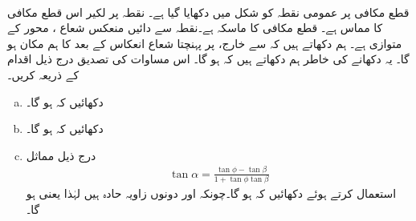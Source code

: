 \\
قطع مکافی  پر عمومی نقطہ  کو شکل  میں دکھایا گیا ہے۔ نقطہ  پر لکیر  اس قطع مکافی کا مماس ہے۔ قطع مکافی کا ماسکہ  ہے۔نقطہ  سے دائیں منعکس شعاع ، محور  کے متوازی  ہے۔ ہم دکھاتے ہیں کہ  سے خارج،  پر پہنچتا شعاع انعکاس کے بعد  کا ہم مکان ہو گا۔ یہ دکھانے کی خاطر ہم دکھاتے ہیں کہ  ہو گا۔ اس مساوات کی تصدیق درج ذیل اقدام کے ذریعہ کریں۔
\begin{enumerate}[a.]
\item
دکھائیں کہ  ہو گا۔
\item
دکھائیں کہ  ہو گا۔
\item
درج ذیل مماثل
\begin{align*}
\tan \alpha=\frac{\tan \phi-\tan\beta}{1+\tan\phi\tan\beta}
\end{align*}
استعمال کرتے ہوئے دکھائیں کہ  ہو گا۔چونکہ  اور  دونوں زاویہ حادہ ہیں لہٰذا
  یعنی  ہو گا۔ 
\end{enumerate}  
